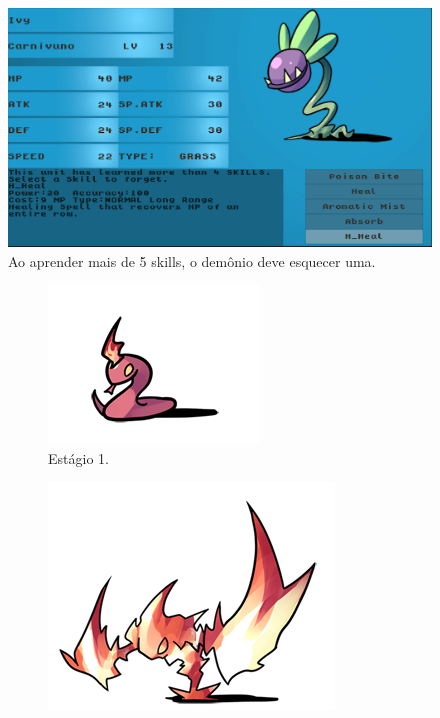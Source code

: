 \documentclass[
	12pt,				%
	openright,			%
	twoside,			%
	a4paper,			%
	english,			%
	french,				%
	spanish,			%
	brazil				%
	]{abntex2}
\begin{document}
\begin{figure}[h!]
 \centering
  \includegraphics[width=0.5\linewidth]{learn.jpg}
  \caption{Ao aprender mais de 5 skills, o demônio deve esquecer uma.}
  \label{fig:learn}
\end{figure}

\begin{figure}[h!]
  \centering
  \begin{subfigure}[b]{0.2\linewidth}
    \includegraphics[width=\linewidth]{stage1.png}
     \caption{Estágio 1.}
  \end{subfigure}
  \begin{subfigure}[b]{0.3\linewidth}
    \includegraphics[width=\linewidth]{stage2.png}

\end{subfigure}
\end{figure}
\end{document}
